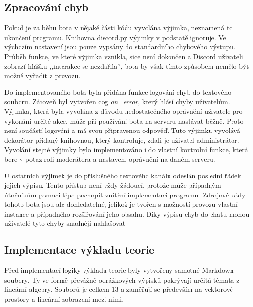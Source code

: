 \documentclass[FM]{tulthesis}
\begin{document}
	
	\subsection{Zpracování chyb}
	
	Pokud je za běhu bota v nějaké části kódu vyvolána výjimka, neznamená to ukončení programu. Knihovna discord.py výjimky v podstatě ignoruje. Ve výchozím nastavení jsou pouze vypsány do standardního chybového výstupu. Průběh funkce, ve které výjimka vznikla, sice není dokončen a Discord uživateli zobrazí hlášku ,,interakce se nezdařila``, bota by však tímto způsobem nemělo být možné vyřadit z provozu.
	
	Do implementovaného bota byla přidána funkce logování chyb do textového souboru. Zároveň byl vytvořen cog \textit{on\_error}, který hlásí chyby uživatelům. Výjimka, která byla vyvolána z důvodu nedostatečného oprávnění uživatele pro vykonání určité akce, může při používání bota na serveru nastávat běžně. Proto není součástí logování a má svou připravenou odpověď. Tuto výjimku vyvolává dekorátor přidaný knihovnou, který kontroluje, zdali je uživatel administrátor. Vyvolání stejné \mbox{výjimky} bylo implementováno i do vlastní kontrolní funkce, která bere v potaz roli moderátora a nastavení oprávnění na daném serveru.
	
	U ostatních výjimek je do příslušného textového kanálu odeslán poslední řádek jejich výpisu. Tento přístup není vždy žádoucí, protože může případným útočníkům pomoci lépe pochopit vnitřní implementaci programu. Zdrojové kódy tohoto bota jsou ale dohledatelné, jelikož je tvořen s možností provozu vlastní instance a případného rozšiřování jeho obsahu. Díky výpisu chyb do chatu mohou uživatelé tyto chyby snadněji nahlašovat.
	
	
	\subsection{Implementace výkladu teorie}

	Před implementací logiky výkladu teorie byly vytvořeny samotné Markdown soubory. Ty ve formě převážně odrážkových výpisků pokrývají určitá témata z \mbox{lineární} algebry. Souborů je celkem 13 a zaměřují se především na vektorové prostory a lineární zobrazení mezi nimi.
\end{document}
